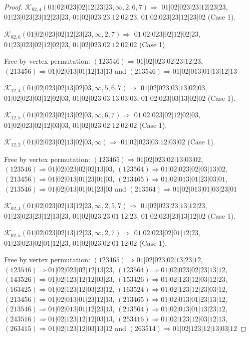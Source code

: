 \documentclass[12pt]{article}
\theoremstyle{plain}
\theoremstyle{definition}
\theoremstyle{remark}
\newcommand{\fancy}[1]{\mathcal{#1}}
\def\K{\fancy{K}}
\begin{document}
\begin{proof}
	
	
	\bigskip
	
	$\K_{02,4}(01|02|023|02|12|23|23,\infty,2, 6, 7)\Rightarrow $ $01|02|023|23|12|23|23$, $01|23|023|23|12|23|23$, $01|02|023|23|12|02|23$, $01|02|023|23|12|23|02$ (Case 1).
	
	$\K_{02,6}(01|02|023|02|12|23|23,\infty,2, 7)\Rightarrow $ $01|02|023|02|12|02|23$, $01|23|023|02|12|02|23$, $01|02|023|02|12|02|02$ (Case 1).
	
	
	
	Free by vertex permutation: $(1 2 3 5 4 6)\Rightarrow 01|02|023|02|23|12|23$, $(2 1 3 4 5 6)\Rightarrow 01|02|013|01|12|13|13$ and $(2 1 3 5 4 6)\Rightarrow 01|02|013|01|13|12|13$
	
	
	
	\bigskip
	
	$\K_{12,4}(01|02|023|02|13|02|03,\infty,5, 6, 7)\Rightarrow $ $01|02|023|03|13|02|03$, $01|02|023|03|12|02|03$, $01|02|023|03|13|03|03$, $01|02|023|03|13|02|02$ (Case 1).
	
	$\K_{12,5}(01|02|023|02|13|02|03,\infty,6, 7)\Rightarrow $ $01|02|023|02|12|02|03$, $01|02|023|02|12|03|03$, $01|02|023|02|12|02|02$ (Case 1).
	
	$\K_{12,2}(01|02|023|02|13|02|03,\infty)\Rightarrow $ $01|02|023|03|12|03|02$ (Case 1).
	
	
	
	Free by vertex permutation: $(1 2 3 4 6 5)\Rightarrow 01|02|023|02|13|03|02$, $(1 2 3 5 4 6)\Rightarrow 01|02|023|02|02|13|03$, $(1 2 3 5 6 4)\Rightarrow 01|02|023|02|03|13|02$, $(2 1 3 4 5 6)\Rightarrow 01|02|013|01|23|01|03$, $(2 1 3 4 6 5)\Rightarrow 01|02|013|01|23|03|01$, $(2 1 3 5 4 6)\Rightarrow 01|02|013|01|01|23|03$ and $(2 1 3 5 6 4)\Rightarrow 01|02|013|01|03|23|01$
	
	
	
	\bigskip
	
	$\K_{02,4}(01|02|023|02|13|12|23,\infty,2, 5, 7)\Rightarrow $ $01|02|023|23|13|12|23$, $01|23|023|23|12|13|23$, $01|02|023|23|01|12|23$, $01|02|023|23|13|12|02$ (Case 1).
	
	$\K_{02,5}(01|02|023|02|13|12|23,\infty,2, 7)\Rightarrow $ $01|02|023|02|01|12|23$, $01|23|023|02|01|12|23$, $01|02|023|02|01|12|02$ (Case 1).
	
	
	
	Free by vertex permutation: $(1 2 3 4 6 5)\Rightarrow 01|02|023|02|13|23|12$, $(1 2 3 5 4 6)\Rightarrow 01|02|023|02|12|13|23$, $(1 2 3 5 6 4)\Rightarrow 01|02|023|02|23|13|12$, $(1 4 3 5 2 6)\Rightarrow 01|02|123|12|12|03|23$, $(1 5 3 4 2 6)\Rightarrow 01|02|123|12|03|12|23$, $(1 6 3 4 2 5)\Rightarrow 01|02|123|12|03|23|12$, $(1 6 3 5 2 4)\Rightarrow 01|02|123|12|23|03|12$, $(2 1 3 4 5 6)\Rightarrow 01|02|013|01|23|12|13$, $(2 1 3 4 6 5)\Rightarrow 01|02|013|01|23|13|12$, $(2 1 3 5 4 6)\Rightarrow 01|02|013|01|12|23|13$, $(2 1 3 5 6 4)\Rightarrow 01|02|013|01|13|23|12$, $(2 4 3 5 1 6)\Rightarrow 01|02|123|12|12|03|13$, $(2 5 3 4 1 6)\Rightarrow 01|02|123|12|03|12|13$, $(2 6 3 4 1 5)\Rightarrow 01|02|123|12|03|13|12$ and $(2 6 3 5 1 4)\Rightarrow 01|02|123|12|13|03|12$
	

\end{proof}
\end{document}
